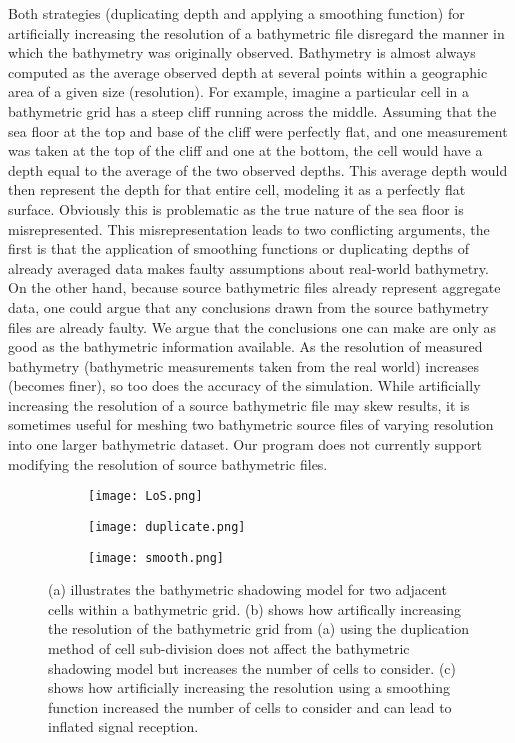 Both strategies (duplicating depth and applying a smoothing function) for artificially increasing the resolution of a bathymetric file disregard the manner in which the bathymetry was originally observed.  Bathymetry is almost always computed as the average observed depth at several points within a geographic area of a given size (resolution).  For example, imagine a particular cell in a bathymetric grid has a steep cliff running across the middle.  Assuming that the sea floor at the top and base of the cliff were perfectly flat, and one measurement was taken at the top of the cliff and one at the bottom, the cell would have a depth equal to the average of the two observed depths.  This average depth would then represent the depth for that entire cell, modeling it as a perfectly flat surface.  Obviously this is problematic as the true nature of the sea floor is misrepresented.  This misrepresentation leads to two conflicting arguments, the first is that the application of smoothing functions or duplicating depths of already averaged data makes faulty assumptions about real-world bathymetry.  On the other hand, because source bathymetric files already represent aggregate data, one could argue that any conclusions drawn from the source bathymetry files are already faulty.  We argue that the conclusions one can make are only as good as the bathymetric information available.  As the resolution of measured bathymetry (bathymetric measurements taken from the real world) increases (becomes finer), so too does the accuracy of the simulation.  While artificially increasing the resolution of a source bathymetric file may skew results, it is sometimes useful for meshing two bathymetric source files of varying resolution into one larger bathymetric dataset.  Our program does not currently support modifying the resolution of source bathymetric files.

\begin{figure}[ht]
	\begin{subfigure}{.5\textwidth}
		\centering
		\texttt{[image: LoS.png]}
		\caption{
			\label{resolutionScale}}
		\label{LoS}
	\end{subfigure}%
	\begin{subfigure}{.5\textwidth}
		\centering
		\texttt{[image: duplicate.png]}
		\caption{
			\label{duplicate}}
	\end{subfigure}
	\begin{subfigure}{.5\textwidth}
		\centering
		\texttt{[image: smooth.png]}
		\caption{
			\label{smooth}}
	\end{subfigure}
	\caption{(a) illustrates the bathymetric shadowing model for two adjacent cells within a bathymetric grid.  (b) shows how artifically increasing the resolution of the bathymetric grid from (a) using the duplication method of cell sub-division does not affect the bathymetric shadowing model but increases the number of cells to consider.  (c) shows how artificially increasing the resolution using a smoothing function increased the number of cells to consider and can lead to inflated signal reception.}
\end{figure}


